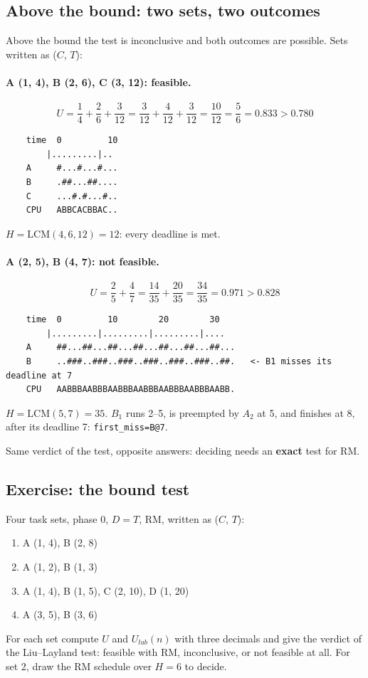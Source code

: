 \subsection{Above the bound: two sets, two outcomes}
Above the bound the test is inconclusive and both outcomes are possible. Sets written as ($C$, $T$):

\paragraph{A (1, 4), B (2, 6), C (3, 12): feasible.}
\[
U = \frac{1}{4} + \frac{2}{6} + \frac{3}{12} = \frac{3}{12} + \frac{4}{12} + \frac{3}{12} = \frac{10}{12} = \frac{5}{6} = 0.833 > 0.780
\]
\begin{verbatim}
    time  0         10
        |.........|..
    A     #...#...#...
    B     .##...##....
    C     ...#.#...#..
    CPU   ABBCACBBAC..
\end{verbatim}
$H = \mathrm{LCM}(4, 6, 12) = 12$: every deadline is met.

\paragraph{A (2, 5), B (4, 7): not feasible.}
\[
U = \frac{2}{5} + \frac{4}{7} = \frac{14}{35} + \frac{20}{35} = \frac{34}{35} = 0.971 > 0.828
\]
\begin{verbatim}
    time  0         10        20        30
        |.........|.........|.........|....
    A     ##...##...##...##...##...##...##...
    B     ..###..###..###..###..###..###..##.   <- B1 misses its deadline at 7
    CPU   AABBBAABBBAABBBAABBBAABBBAABBBAABB.
\end{verbatim}
$H = \mathrm{LCM}(5, 7) = 35$. $B_1$ runs 2--5, is preempted by $A_2$ at 5, and finishes at 8, after its deadline 7: \texttt{first\_miss=B@7}.

Same verdict of the test, opposite answers: deciding needs an \textbf{exact} test for RM.

\subsection{Exercise: the bound test}
Four task sets, phase 0, $D = T$, RM, written as ($C$, $T$):
\begin{enumerate}
    \item A (1, 4), B (2, 8)
    \item A (1, 2), B (1, 3)
    \item A (1, 4), B (1, 5), C (2, 10), D (1, 20)
    \item A (3, 5), B (3, 6)
\end{enumerate}
For each set compute $U$ and $U_{lub}(n)$ with three decimals and give the verdict of the Liu--Layland test: feasible with RM, inconclusive, or not feasible at all. For set 2, draw the RM schedule over $H = 6$ to decide.


